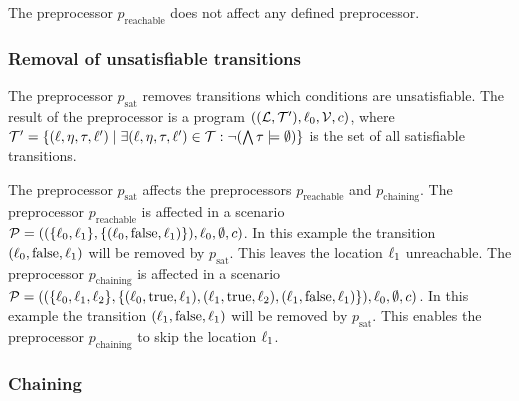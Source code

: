 The preprocessor $p_{\text{reachable}}$ does not affect any defined preprocessor.

\subsubsection{Removal of unsatisfiable transitions}

The preprocessor $p_{\text{sat}}$ removes transitions which conditions are unsatisfiable.
The result of the preprocessor is a program $((\mathcal{L}, \mathcal{T}'), \ell_0, \mathcal{V}, c)$, where $\mathcal{T}' = \lbrace (\ell,\eta,\tau,\ell') \mid \exists (\ell,\eta,\tau,\ell') \in \mathcal{T}: \neg (\bigwedge \tau \models \emptyset) \rbrace$ is the set of all satisfiable transitions.

The preprocessor $p_{\text{sat}}$ affects the preprocessors $p_{\text{reachable}}$ and $p_{\text{chaining}}$.
The preprocessor $p_{\text{reachable}}$ is affected in a scenario $\mathcal{P} = ((\lbrace \ell_0, \ell_1 \rbrace, \lbrace (\ell_0,\text{false},\ell_1) \rbrace), \ell_0, \emptyset, c)$.
In this example the transition $(\ell_0,\text{false},\ell_1)$ will be removed by $p_{\text{sat}}$.
This leaves the location $\ell_1$ unreachable.
The preprocessor $p_{\text{chaining}}$ is affected in a scenario $\mathcal{P} = ((\lbrace \ell_0, \ell_1, \ell_2 \rbrace, \lbrace (\ell_0,\text{true},\ell_1), (\ell_1,\text{true},\ell_2), (\ell_1,\text{false},\ell_1) \rbrace), \ell_0, \emptyset, c)$.
In this example the transition $(\ell_1,\text{false},\ell_1)$ will be removed by $p_{\text{sat}}$.
This enables the preprocessor $p_{\text{chaining}}$ to skip the location $\ell_1$.

\subsubsection{Chaining}

